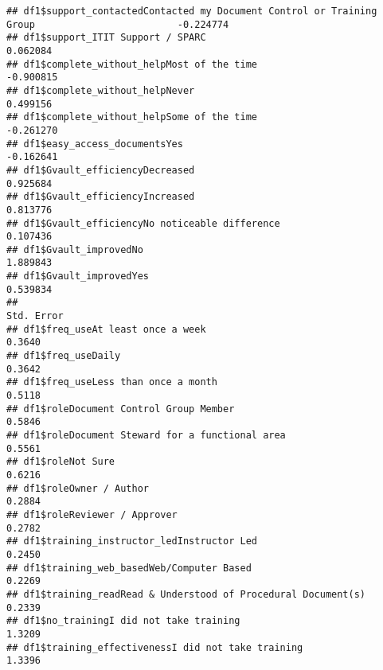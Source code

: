 \documentclass[
]{article}
\begin{document}
\begin{verbatim}
## df1$support_contactedContacted my Document Control or Training Group                         -0.224774
## df1$support_ITIT Support / SPARC                                                              0.062084
## df1$complete_without_helpMost of the time                                                    -0.900815
## df1$complete_without_helpNever                                                                0.499156
## df1$complete_without_helpSome of the time                                                    -0.261270
## df1$easy_access_documentsYes                                                                 -0.162641
## df1$Gvault_efficiencyDecreased                                                                0.925684
## df1$Gvault_efficiencyIncreased                                                                0.813776
## df1$Gvault_efficiencyNo noticeable difference                                                 0.107436
## df1$Gvault_improvedNo                                                                         1.889843
## df1$Gvault_improvedYes                                                                        0.539834
##                                                                                              Std. Error
## df1$freq_useAt least once a week                                                                 0.3640
## df1$freq_useDaily                                                                                0.3642
## df1$freq_useLess than once a month                                                               0.5118
## df1$roleDocument Control Group Member                                                            0.5846
## df1$roleDocument Steward for a functional area                                                   0.5561
## df1$roleNot Sure                                                                                 0.6216
## df1$roleOwner / Author                                                                           0.2884
## df1$roleReviewer / Approver                                                                      0.2782
## df1$training_instructor_ledInstructor Led                                                        0.2450
## df1$training_web_basedWeb/Computer Based                                                         0.2269
## df1$training_readRead & Understood of Procedural Document(s)                                     0.2339
## df1$no_trainingI did not take training                                                           1.3209
## df1$training_effectivenessI did not take training                                                1.3396

\end{verbatim}
\end{document}
